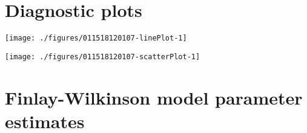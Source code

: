 \documentclass[a4paper,11pt]{article}\usepackage[]{graphicx}\usepackage[]{color}
\makeatletter
\def\maxwidth{ %
  \ifdim\Gin@nat@width>\linewidth
    \linewidth
  \else
    \Gin@nat@width
  \fi
}
\newenvironment{knitrout}{}{} %
\makeatother
\begin{document}
\clearpage
\section{Diagnostic plots}
\begin{knitrout}
\color{fgcolor}

\texttt{[image: ./figures/011518120107-linePlot-1]} \hfill{}



\end{knitrout}
\clearpage
\begin{knitrout}
\color{fgcolor}
\texttt{[image: ./figures/011518120107-scatterPlot-1]} 

\end{knitrout}
\clearpage

\section{Finlay-Wilkinson model parameter estimates}
\end{document}
